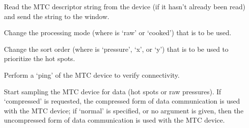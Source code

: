   



  
  
  \objListIOEnd






\objItemCommands[]

  \objListCmdBegin
  
  Read the MTC descriptor string from the device (if it hasn't already been read) and send the string to the \MaxName{} window.

  Change the processing mode (where  is `raw' or `cooked') that is to be used.

  Change the sort order (where  is `pressure', `x', or `y') that is to be used to prioritize the hot spots.

  Perform a `ping' of the MTC device to verify connectivity.

  Start sampling the MTC device for data (hot spots or raw pressures).
  If `compressed' is requested, the compressed form of data communication is used with the MTC device;
  if `normal' is specified, or no argument is given, then the uncompressed form of data communication is used with the MTC device.

